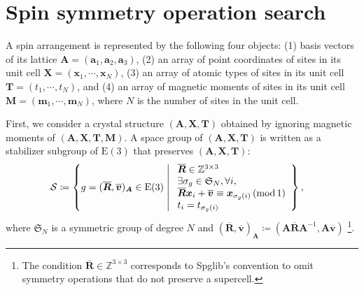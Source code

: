 \section{Spin symmetry operation search}

A spin arrangement is represented by the following four objects:
(1) basis vectors of its lattice $\bm{A} = (\bm{a}_{1}, \bm{a}_{2}, \bm{a}_{3})$,
(2) an array of point coordinates of sites in its unit cell $\bm{X} = (\bm{x}_{1}, \cdots, \bm{x}_{N})$,
(3) an array of atomic types of sites in its unit cell $\bm{T} = (t_{1}, \cdots, t_{N})$,
and (4) an array of magnetic moments of sites in its unit cell $\bm{M} = (\bm{m}_{1}, \cdots, \bm{m}_{N})$,
where $N$ is the number of sites in the unit cell.

First, we consider a crystal structure $(\bm{A}, \bm{X}, \bm{T})$ obtained by ignoring magnetic moments of $(\bm{A}, \bm{X}, \bm{T}, \bm{M})$.
A space group of $(\bm{A}, \bm{X}, \bm{T})$ is written as a stabilizer subgroup of $\mathrm{E}(3)$ that preserves $(\bm{A}, \bm{X}, \bm{T})$:
\begin{align}
    \mathcal{S}
        &\coloneqq \left\{ 
                g = ( \overline{\bm{R}}, \overline{\bm{v}} )_{\bm{A}} \in \mathrm{E}(3)
             \mathrel{}\middle|\mathrel{} 
                \begin{array}{l}
                    \overline{\bm{R}} \in \mathbb{Z}^{3 \times 3} \\
                    \exists \sigma_{g} \in \mathfrak{S}_{N}, \forall i, \\
                    \overline{\bm{R}} \bm{x}_{i} + \overline{\bm{v}} \equiv \bm{x}_{\sigma_{g}(i)} \, (\mathrm{mod} \, 1) \\
                    t_{i} = t_{\sigma_{g}(i)}
                \end{array}
             \right\},
\end{align}
where $\mathfrak{S}_{N}$ is a symmetric group of degree $N$ and $( \overline{\bm{R}}, \overline{\bm{v}} )_{\bm{A}} \coloneqq ( \bm{A}\overline{\bm{R}}\bm{A}^{-1}, \bm{A}\overline{\bm{v}} )$ \footnote {
  The condition $\overline{\bm{R}} \in \mathbb{Z}^{3 \times 3}$ corresponds to Spglib's convention to omit symmetry operations that do not preserve a supercell.
}.

